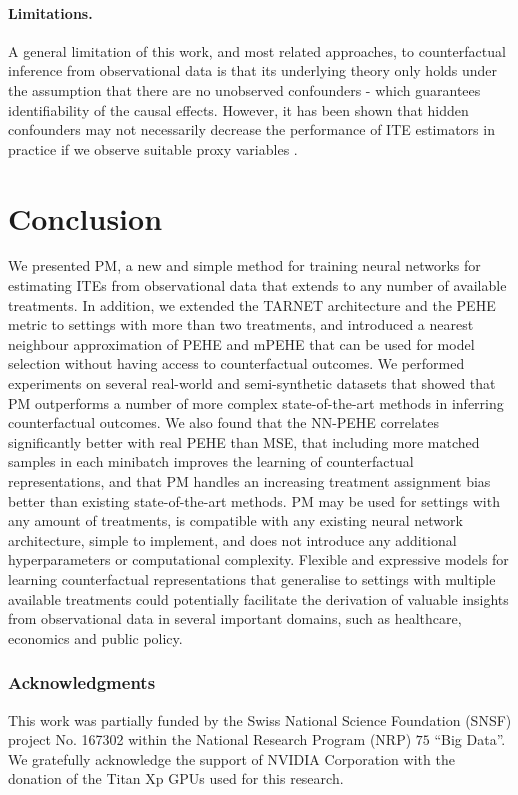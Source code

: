 \documentclass{article}
\begin{document}
\paragraph{Limitations.} A general limitation of this work, and most related approaches, to counterfactual inference from observational data is that its underlying theory only holds under the assumption that there are no unobserved confounders - which guarantees identifiability of the causal effects. However, it has been shown that hidden confounders may not necessarily decrease the performance of ITE estimators in practice if we observe suitable proxy variables \cite{montgomery2000measuring,louizos2017causal}. 

\section{Conclusion}
We presented PM, a new and simple method for training neural networks for estimating ITEs from observational data that extends to any number of available treatments. In addition, we extended the TARNET architecture and the PEHE metric to settings with more than two treatments, and introduced a nearest neighbour approximation of PEHE and mPEHE that can be used for model selection without having access to counterfactual outcomes. We performed experiments on several real-world and semi-synthetic datasets that showed that PM outperforms a number of more complex state-of-the-art methods in inferring counterfactual outcomes. We also found that the NN-PEHE correlates significantly better with real PEHE than MSE, that including more matched samples in each minibatch improves the learning of counterfactual representations, and that PM handles an increasing treatment assignment bias better than existing state-of-the-art methods. PM may be used for settings with any amount of treatments, is compatible with any existing neural network architecture, simple to implement, and does not introduce any additional hyperparameters or computational complexity. Flexible and expressive models for learning counterfactual representations that generalise to settings with multiple available treatments could potentially facilitate the derivation of valuable insights from observational data in several important domains, such as healthcare, economics and public policy.

\nocite{kapelner2013bartmachine,athey2016generalized}

\subsubsection*{Acknowledgments}
This work was partially funded by the Swiss National Science Foundation (SNSF) project No. 167302 within the National Research Program (NRP) $75$ ``Big Data''. We gratefully acknowledge the support of NVIDIA Corporation with the donation of the Titan Xp GPUs used for this research. 





\end{document}
